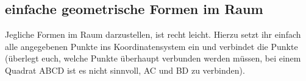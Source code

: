 \subsection{einfache geometrische Formen im Raum}
Jegliche Formen im Raum darzustellen, ist recht leicht. Hierzu setzt ihr einfach alle angegebenen Punkte ins Koordinatensystem ein und verbindet die Punkte (überlegt euch, welche Punkte überhaupt verbunden werden müssen, bei einem Quadrat ABCD ist es nicht sinnvoll, AC und BD zu verbinden).
